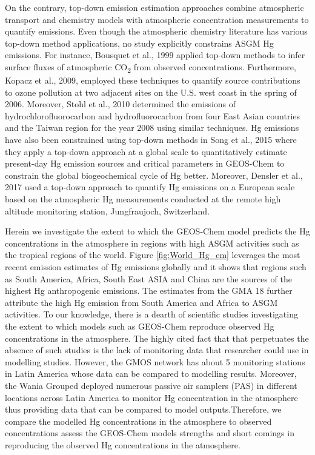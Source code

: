 \begin{flushleft}
On the contrary, top-down emission estimation approaches combine atmospheric transport and chemistry models with atmospheric concentration measurements to quantify emissions. Even though the atmospheric chemistry literature has various top-down method applications, no study explicitly constrains ASGM Hg emissions. For instance, Bousquet et al., 1999 applied top-down methods to infer surface fluxes of atmospheric CO\textsubscript{2} from observed concentrations\cite{bousquet_inverse_1999}. Furthermore, Kopacz et al., 2009, employed these techniques to quantify source contributions to ozone pollution at two adjacent sites on the U.S. west coast in the spring of 2006. Moreover, Stohl et al., 2010 determined the emissions of hydrochlorofluorocarbon and hydrofluorocarbon from four East Asian countries and the Taiwan region for the year 2008 using similar techniques. Hg emissions have also been constrained using top-down methods in Song et al., 2015 where they apply a top-down approach at a global scale to quantitatively estimate present-day Hg emission sources and critical parameters in GEOS-Chem to constrain the global biogeochemical cycle of Hg better. Moreover, Densler et al., 2017 used a top-down approach to quantify Hg emissions on a European scale based on the atmospheric Hg measurements conducted at the remote high altitude monitoring station, Jungfraujoch, Switzerland. 
\end{flushleft}
\begin{flushleft}
Herein we investigate the extent to which the GEOS-Chem model predicts the Hg concentrations in the atmosphere in regions with high ASGM activities such as the tropical regions of the world. Figure \ref{fig:World_Hg_em} leverages the most recent emission estimates of Hg emissions globally and it shows that regions such as South America, Africa, South East ASIA and China are the sources of the highest Hg anthropogenic emissions. The estimates from the GMA 18 further attribute the high Hg emission from South America and Africa to ASGM activities\cite{united_nations_environment_programme_technical_2019}. To our knowledge, there is a dearth of scientific studies investigating the extent to which models such as GEOS-Chem reproduce observed Hg concentrations in the atmosphere. The highly cited fact that that perpetuates the absence of such studies is the lack of monitoring data that researcher could use in modelling studies. However, the GMOS network has about 5 monitoring stations in Latin America whose data can be compared to modelling results. Moreover, the Wania Grouped deployed numerous passive air samplers (PAS)  in different locations across Latin America to monitor Hg concentration in the atmosphere thus providing data that can be compared to model outputs.Therefore, we compare the modelled Hg concentrations in the atmosphere to observed concentrations assess the GEOS-Chem models strengths and short comings in reproducing the observed Hg concentrations in the atmosphere. 
\end{flushleft}

